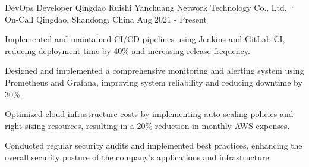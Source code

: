 

\begin{cventries}


  \cventry
  {DevOps Developer} %
  {Qingdao Ruishi Yanchuang Network Technology Co., Ltd. · On-Call} %
  {Qingdao, Shandong, China} %
  {Aug 2021 - Present} %
  {
    \begin{cvitems} %
      \item {Implemented and maintained CI/CD pipelines using Jenkins and GitLab CI, reducing deployment time by 40\% and increasing release frequency.}
      \item {Designed and implemented a comprehensive monitoring and alerting system using Prometheus and Grafana, improving system reliability and reducing downtime by 30\%.}
      \item {Optimized cloud infrastructure costs by implementing auto-scaling policies and right-sizing resources, resulting in a 20\% reduction in monthly AWS expenses.}
      \item {Conducted regular security audits and implemented best practices, enhancing the overall security posture of the company's applications and infrastructure.}
    \end{cvitems}
  }

  \vspace{5mm}


\end{cventries}
